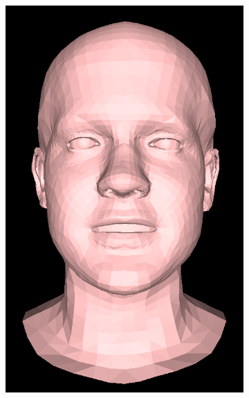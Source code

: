 \begin{figure}[h!]
\begin{subfigure}[b]{0.19\textwidth}
        \includegraphics[width=\textwidth]{figures/gen_sample/00031.png}
    \end{subfigure}
    \begin{subfigure}[b]{0.19\textwidth}

\end{subfigure}
\end{figure}
